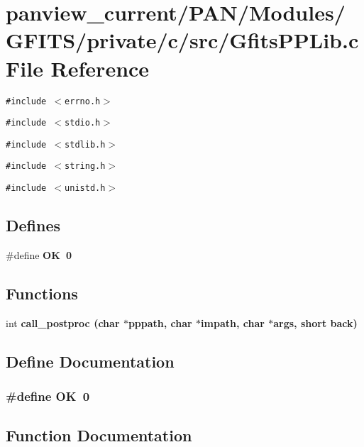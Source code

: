\section{panview\_\-current/PAN/Modules/GFITS/private/c/src/Gfits\-PPLib.c File Reference}
\label{GfitsPPLib_8c}
{\tt \#include $<$errno.h$>$}\par
{\tt \#include $<$stdio.h$>$}\par
{\tt \#include $<$stdlib.h$>$}\par
{\tt \#include $<$string.h$>$}\par
{\tt \#include $<$unistd.h$>$}\par
\subsection*{Defines}
\begin{CompactItemize}
\item 
\#define \bf{OK}~0
\end{CompactItemize}
\subsection*{Functions}
\begin{CompactItemize}
\item 
int \bf{call\_\-postproc} (char $\ast$pppath, char $\ast$impath, char $\ast$args, short back)
\end{CompactItemize}


\subsection{Define Documentation}
\subsubsection{\setlength{\rightskip}{0pt plus 5cm}\#define OK~0}\label{GfitsPPLib_8c_ba51915c87d64af47fb1cc59348961c9}




\subsection{Function Documentation}
